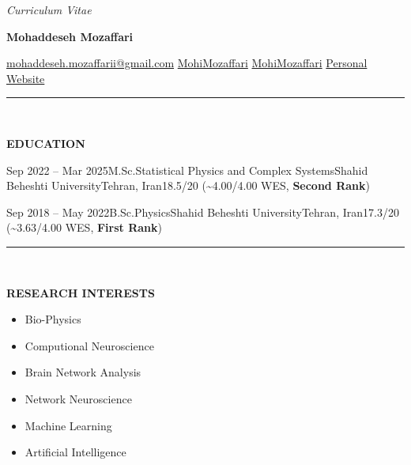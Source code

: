 \documentclass[12pt, b4paper]{cv}
\begin{document}
\begin{center}
	\textit{Curriculum Vitae}\\
	{\Huge \textbf{Mohaddeseh Mozaffari}\par}

	\href{mailto:mohaddeseh.mozaffarii@gmail.com}{ mohaddeseh.mozaffarii@gmail.com}
	\hspace{5pt} 
	\href{https://www.linkedin.com/in/MohiMozaffari/}{ MohiMozaffari}
	\hspace{5pt} 
	\href{https://github.com/MohiMozaffari}{ MohiMozaffari}
	\hspace{5pt} 
	\href{https://mohimozaffari.github.io/}{ Personal Website} 
\end{center}


\vspace{-0.15in}
\rule{\textwidth}{1pt}\\
\vspace{-0.15in}


{\Large \textbf{EDUCATION}}
\vspace{0.1in}


\begin{education}{Sep 2022 -- Mar 2025}{M.Sc.}{Statistical Physics and Complex Systems}{Shahid Beheshti University}{Tehran, Iran}{{18.5/20 (\textasciitilde 4.00/4.00 WES, \textbf{Second Rank})}}%
\end{education}

\begin{education}{Sep 2018 -- May 2022}{B.Sc.}{Physics}{Shahid Beheshti University}{Tehran, Iran}{17.3/20 (\textasciitilde 3.63/4.00 WES, \textbf{First Rank})}
\end{education}

\vspace{-0.15in}
\rule{\textwidth}{1pt}\\
\vspace{-0.15in}


{\Large \textbf{RESEARCH INTERESTS}}

\vspace{-5pt}
\begin{multicols}{3}
	\begin{itemize}
		\setlength\itemsep{-1pt}
				\item Bio-Physics
				\item Computional Neuroscience
				\item Brain Network Analysis
				\item Network Neuroscience
				\item Machine Learning
				\item Artificial Intelligence
	\end{itemize}
\end{multicols}
\end{document}
